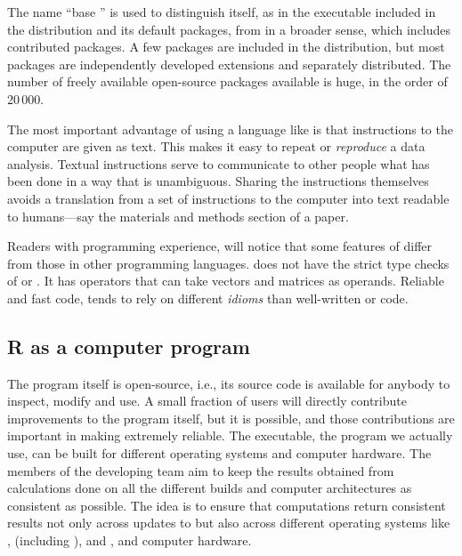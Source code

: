 \documentclass[krantz2]{krantz}\usepackage{knitr}
\begin{document}
The name ``base \Rlang{}'' is used to distinguish \Rlang itself, as in the \Rpgrm executable included in the \Rpgrm distribution and its default packages, from \Rlang in a broader sense, which includes contributed packages. A few packages are included in the \Rpgrm distribution, but most \Rlang packages are independently developed extensions and separately distributed. The number of freely available open-source \Rlang packages available is huge, in the order of 20\,000.

The most important advantage of using a language like \Rlang is that instructions to the computer are given as text. This makes it easy to repeat or \emph{reproduce} a data analysis. Textual instructions serve to communicate to other people what has been done in a way that is unambiguous. Sharing the instructions themselves avoids a translation from a set of instructions to the computer into text readable to humans---say the materials and methods section of a paper.

\begin{explainbox}
Readers with programming experience, will notice that some features of \Rlang differ from those in other programming languages. \Rlang does not have the strict type checks of  or \Cpplang. It has operators that can take vectors and matrices as operands. Reliable and fast \Rlang code, tends to rely on different \emph{idioms} than well-written  or \Cpplang code.
\end{explainbox}

\subsection{R as a computer program}
The \Rpgrm program itself is open-source, i.e., its source code is available for anybody to inspect, modify and use. A small fraction of users will directly contribute improvements to the \Rpgrm program itself, but it is possible, and those contributions are important in making \Rpgrm extremely reliable. The executable, the \Rpgrm program we actually use, can be built for different operating systems and computer hardware. The members of the \Rpgrm developing team aim to keep the results obtained from calculations done on all the different builds and computer architectures as consistent as possible. The idea is to ensure that computations return consistent results not only across updates to \Rpgrm but also across different operating systems like ,  (including ), and , and computer hardware.
\end{document}
